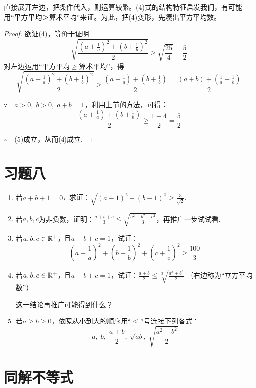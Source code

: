 \begin{analyze}
直接展开左边，把条件代入，则运算较繁。(4)式的结构特征启发我们，有可能用“平方平均＞算术平均”来证。为此，把(4)变形，先凑出平方平均数。
\end{analyze}

\begin{proof}
    欲证(4)，等价于证明
\begin{equation}
    \sqrt{\frac{\left(a+\frac{1}{a}\right)^2 +    \left(b+\frac{1}{b}\right)^2}{2}}\ge \sqrt{\frac{25}{4}}=\frac{5}{2}
\end{equation}
对左边运用“平方平均$\ge $算术平均”，得
\[\sqrt{\frac{\left(a+\frac{1}{a}\right)^2 +    \left(b+\frac{1}{b}\right)^2}{2}}\ge \frac{\left(a+\frac{1}{a}\right) +    \left(b+\frac{1}{b}\right)}{2}=\frac{(a+b)+\left(\frac{1}{a}+\frac{1}{b}\right)}{2}\]

$\because\quad a>0,\; b>0,\; a+b=1$，利用上节的方法，可得：
\[\frac{\left(a+\frac{1}{a}\right) +    \left(b+\frac{1}{b}\right)}{2}\ge \frac{1+4}{2}=\frac{5}{2}\]

$\therefore\quad $(5)成立，从而(4)成立.
\end{proof}

\section*{习题八}
\begin{enumerate}
    \item 若$a+b+1=0$，求证：$\sqrt{(a-1)^2+(b-1)^2}\ge \frac{3}{\sqrt{2}}$.
    \item 若$a,b,c$为非负数，证明：$\frac{a+b+c}{3}\le \sqrt{\frac{a^2+b^2+c^2}{3}}$，再推广一步试试看.
    \item 若$a,b,c\in\mathbb{R}^+$，且$a+b+c=1$，试证：
    \[\left(a+\frac{1}{a}\right)^2+\left(b+\frac{1}{b}\right)^2+\left(c+\frac{1}{c}\right)^2\ge \frac{100}{3}\]
    \item 若$a,b,c\in\mathbb{R}^+$，且$a+b+c=1$，试证：$\frac{a+b}{2}\le \sqrt[3]{\frac{a^3+b^3}{2}}$ （右边称为“立方平均数”）
    
    这一结论再推广可能得到什么？
    \item 若$a\ge b\ge 0$，依照从小到大的顺序用“$\le $”号连接下列各式：
\[a,\; b,\; \frac{a+b}{2},\; \sqrt{ab},\; \sqrt{\frac{a^2+b^2}{2}}\]
\end{enumerate}


\section{同解不等式}

